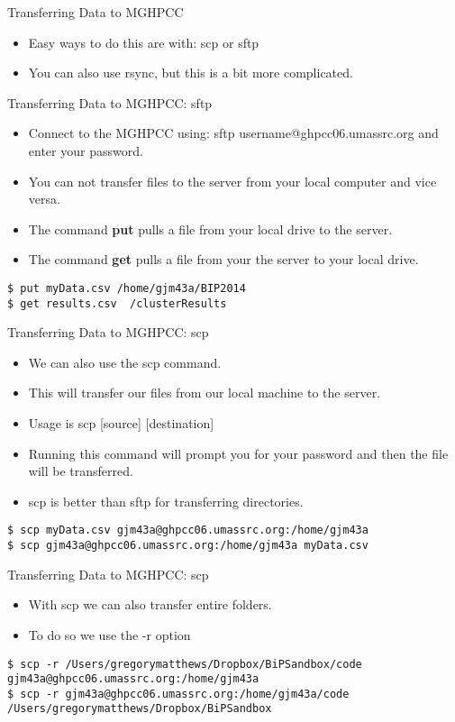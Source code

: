 \begin{frame}{Transferring Data to MGHPCC}
\begin{itemize}
\item Easy ways to do this are with: scp or sftp
\item You can also use rsync, but this is a bit more complicated.
\end{itemize}
\end{frame}


\begin{frame}{Transferring Data to MGHPCC: sftp}
\begin{itemize}
\item Connect to the MGHPCC using: sftp username@ghpcc06.umassrc.org and enter your password.  
\item You can not transfer files to the server from your local computer and vice versa.  
\item The command {\bf put} pulls a file from your local drive to the server.
\item The command {\bf get} pulls a file from your the server to your local drive.
\end{itemize}
{\tt \$ put myData.csv /home/gjm43a/BIP2014}\\
{\tt \$ get results.csv ~/clusterResults}
\end{frame}

\begin{frame}{Transferring Data to MGHPCC: scp}
\begin{itemize}
\item We can also use the scp command.
\item This will transfer our files from our local machine to the server. 
\item Usage is scp [source] [destination]
\item Running this command will prompt you for your password and then the file will be transferred.  
\item scp is better than sftp for transferring directories.  
\end{itemize}
{\tt \$ scp myData.csv gjm43a@ghpcc06.umassrc.org:/home/gjm43a}\\
{\tt \$ scp gjm43a@ghpcc06.umassrc.org:/home/gjm43a myData.csv}
\end{frame}

\begin{frame}{Transferring Data to MGHPCC: scp}
\begin{itemize}
\item With scp we can also transfer entire folders.
\item To do so we use the -r option
\end{itemize}
{\tt \$ scp -r /Users/gregorymatthews/Dropbox/BiPSandbox/code gjm43a@ghpcc06.umassrc.org:/home/gjm43a}\\
{\tt \$ scp -r gjm43a@ghpcc06.umassrc.org:/home/gjm43a/code /Users/gregorymatthews/Dropbox/BiPSandbox}
\end{frame}



